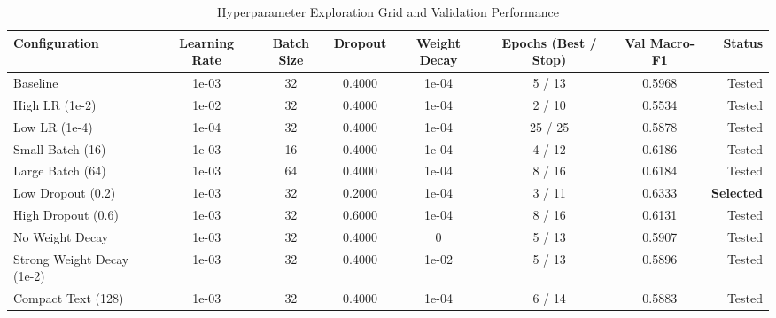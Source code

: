 \begin{table}
\caption{Hyperparameter Exploration Grid and Validation Performance}
\label{tab:hyperparameter_tuning}
\begin{tabular}{lccccccr}
\toprule
Configuration & Learning Rate & Batch Size & Dropout & Weight Decay & Epochs (Best / Stop) & Val Macro-F1 & Status \\
\midrule
Baseline & 1e-03 & 32 & 0.4000 & 1e-04 & 5 / 13 & 0.5968 & Tested \\
High LR (1e-2) & 1e-02 & 32 & 0.4000 & 1e-04 & 2 / 10 & 0.5534 & Tested \\
Low LR (1e-4) & 1e-04 & 32 & 0.4000 & 1e-04 & 25 / 25 & 0.5878 & Tested \\
Small Batch (16) & 1e-03 & 16 & 0.4000 & 1e-04 & 4 / 12 & 0.6186 & Tested \\
Large Batch (64) & 1e-03 & 64 & 0.4000 & 1e-04 & 8 / 16 & 0.6184 & Tested \\
Low Dropout (0.2) & 1e-03 & 32 & 0.2000 & 1e-04 & 3 / 11 & 0.6333 & \textbf{Selected} \\
High Dropout (0.6) & 1e-03 & 32 & 0.6000 & 1e-04 & 8 / 16 & 0.6131 & Tested \\
No Weight Decay & 1e-03 & 32 & 0.4000 & 0 & 5 / 13 & 0.5907 & Tested \\
Strong Weight Decay (1e-2) & 1e-03 & 32 & 0.4000 & 1e-02 & 5 / 13 & 0.5896 & Tested \\
Compact Text (128) & 1e-03 & 32 & 0.4000 & 1e-04 & 6 / 14 & 0.5883 & Tested \\
\bottomrule
\end{tabular}
\end{table}
